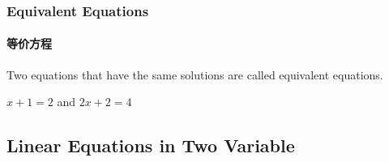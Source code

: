 \documentclass[
	11pt, %
	handout,
]{beamer}
\begin{document}

\begin{frame}
	\frametitle{Equivalent Equations}
	\framesubtitle{等价方程}
	\begin{definition}
		Two equations that have the \alert{same} solutions are called equivalent equations.
	\end{definition}
	
	\smallskip %
	
	\begin{example}

  $x + 1 = 2$ and $2x + 2 = 4$

	\end{example}
	\end{frame}

\subsection{Linear Equations in Two Variable}

\end{document}
